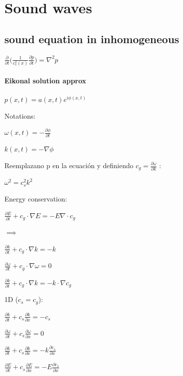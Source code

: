 \documentclass{article}
\begin{document}
\section{Sound waves}

\subsection{sound equation in inhomogeneous}

$\frac{\partial}{\partial t} \big(\frac{1}{c_s^{2}(x)} \frac{\partial p}{\partial t}\big) = \nabla^{2} p    $

\paragraph{Eikonal solution approx}


$p(x,t) = a(x,t) e^{i \phi(x,t)}$

Notations:

$\omega(x,t) = -\frac{\partial \phi}{\partial t}$

$k(x,t) = -\nabla \phi$


Reemplazano p en la ecuación y definiendo $c_g = \frac{\partial \omega}{\partial k}$ :

$\omega^{2} = c_s^{2} k^2$

Energy conservation:

$\frac{\partial E}{\partial t} + c_g \cdot \nabla E = -E \nabla \cdot c_g $


$\implies $


$\frac{\partial k}{\partial t} + c_g \cdot \nabla k = -k \ $

$\frac{\partial \omega}{\partial t} + c_g \cdot \nabla \omega = 0 $

$\frac{\partial k}{\partial t} + c_g \cdot \nabla k = -k \cdot \nabla c_g $



1D ($c_s = c_g$):

$\frac{\partial k}{\partial t} + c_s \frac{\partial k}{\partial x} = -c_s $

$\frac{\partial \omega}{\partial t} + c_s \frac{\partial \omega}{\partial x} = 0 $

$\frac{\partial k}{\partial t} + c_s \frac{\partial k}{\partial x} = -k \frac{\partial c_s}{\partial x} $

$\frac{\partial E}{\partial t} + c_s \frac{\partial E}{\partial x} = -E \frac{\partial  c_s}{\partial x} $
\end{document}
